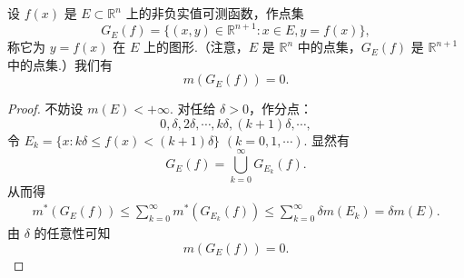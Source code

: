 \documentclass[../../main.tex]{subfiles}
\begin{document}
\begin{corollary}[可测函数图形的测度]\label{corollary:可测函数图形的测度}
设 \( f(x) \) 是 \( E \subset \mathbb{R}^n \) 上的非负实值可测函数，作点集
\[
G_E(f) = \{ (x, y) \in \mathbb{R}^{n + 1} : x \in E, y = f(x) \},
\]
称它为 \( y = f(x) \) 在 \( E \) 上的图形.（注意，\( E \) 是 \( \mathbb{R}^n \) 中的点集，\( G_E(f) \) 是 \( \mathbb{R}^{n + 1} \) 中的点集.）我们有
\[
m(G_E(f)) = 0.
\]
\end{corollary}
\begin{proof}
不妨设 \( m(E) < +\infty \). 对任给 \( \delta > 0 \)，作分点：
\[
0, \delta, 2\delta, \cdots, k\delta, (k + 1)\delta, \cdots,
\]
令 \( E_k = \{ x : k\delta \leqslant f(x) < (k + 1)\delta \} \) \( (k = 0, 1, \cdots) \). 显然有
\[
G_E(f) = \bigcup_{k = 0}^{\infty} G_{E_k}(f).
\]
从而得
\begin{align*}
m^*(G_E(f)) \leqslant \sum_{k = 0}^{\infty} m^*(G_{E_k}(f)) \leqslant \sum_{k = 0}^{\infty} \delta m(E_k) = \delta m(E).
\end{align*}
由 \( \delta \) 的任意性可知
\[
m(G_E(f)) = 0.
\]
\end{proof}
\end{document}
